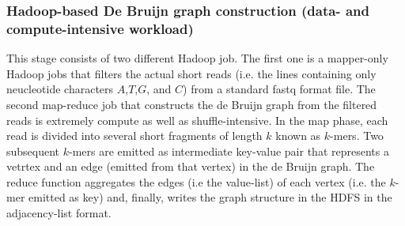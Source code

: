 \documentclass[conference]{IEEEtran}
\begin{document}
\subsubsection {Hadoop-based De Bruijn graph construction (data- and compute-intensive workload)}
This stage consists of two different Hadoop job.
The first one is a mapper-only Hadoop jobs that filters the actual short reads (i.e. the lines containing only neucleotide characters $A$,$T$,$G$, and $C$) from a standard fastq format file. 
The second map-reduce job that constructs the de Bruijn graph from the filtered reads is extremely compute as well as shuffle-intensive. 
In the map phase, each read is divided into several short fragments of length $k$ known as $k$-mers. 
Two subsequent $k$-mers are emitted as intermediate key-value pair that represents  a vetrtex and an edge (emitted from that vertex) in the de Bruijn graph.  
The reduce function aggregates the edges (i.e the value-list) of each vertex (i.e. the $k$-mer emitted as key) and, finally, writes the graph structure in the HDFS in the adjacency-list format. 
\end{document}
